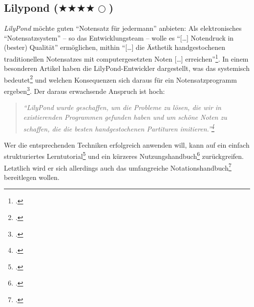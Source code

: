 %
%
%



\subsection{Lilypond ($\bigstar\bigstar\bigstar\bigstar\Circle$)}


\textit{LilyPond} möchte guten \enquote{Notensatz für jedermann} anbieten: Als
elektronisches \enquote{Notensatzsystem} -- so das Entwicklungsteam -- wolle es
\enquote{[\ldots] Notendruck in (bester) Qualität} ermöglichen, mithin
\enquote{[\ldots] die Ästhetik handgestochenen traditionellen Notensatzes mit
computergesetzten Noten [\ldots] erreichen}\footcite[vgl.][\nopage
wp]{LilyPond2018a}. In einem besonderen Artikel haben die LilyPond-Entwickler
dargestellt, was das systemisch bedeutet\footcite[vgl.][5ff]{LilyPond2018d} und
welchen Konsequenzen sich daraus für ein Notensatzprogramm
ergeben\footcite[vgl.][8ff]{LilyPond2018d}. Der daraus erwachsende Anspruch ist
hoch:

\begin{quote}\textit{\enquote{LilyPond wurde geschaffen, um die Probleme zu
lösen, die wir in existierenden Programmen gefunden haben und um schöne Noten zu
schaffen, die die besten handgestochenen Partituren
imitieren.}\footcite[vgl.][2]{LilyPond2018d} }
\end{quote}

Wer die entsprechenden Techniken erfolgreich anwenden will, kann auf ein einfach
strukturiertes Lerntutorial\footcite[vgl.][20ff]{LilyPond2018b} und ein kürzeres
Nutzungshandbuch\footcite[vgl.][1ff]{LilyPond2018e} zurückgreifen. Letztlich
wird er sich allerdings auch das umfangreiche
Notationshandbuch\footcite[vgl.][1ff]{LilyPond2018c} bereitlegen wollen.

